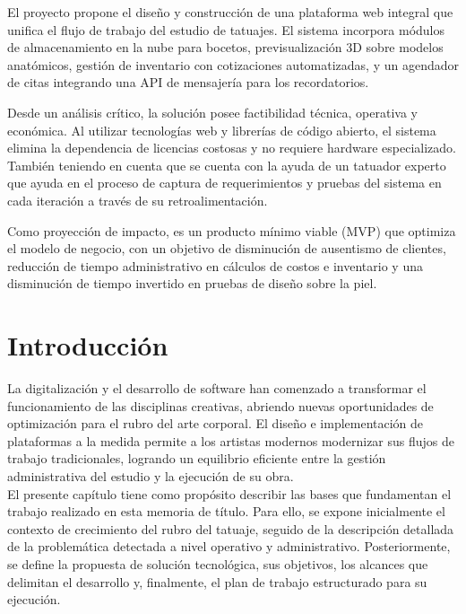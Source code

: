 \documentclass[12pt,letterpaper,oneside]{report}
\begin{document}
El proyecto propone el diseño y construcción de una plataforma web integral que unifica el flujo de trabajo del estudio de tatuajes. El sistema incorpora módulos de almacenamiento en la nube para bocetos, previsualización 3D sobre modelos anatómicos, gestión de inventario con cotizaciones automatizadas, y un agendador de citas integrando una API de mensajería para los recordatorios.

Desde un análisis crítico, la solución posee factibilidad técnica, operativa y económica. Al utilizar tecnologías web y librerías de código abierto, el sistema elimina la dependencia de licencias costosas y no requiere hardware especializado. También teniendo en cuenta que se cuenta con la ayuda de un tatuador experto que ayuda en el proceso de captura de requerimientos y pruebas del sistema en cada iteración a través de su retroalimentación.

Como proyección de impacto, es un producto mínimo viable (MVP) que optimiza el modelo de negocio, con un objetivo de disminución de ausentismo de clientes, reducción de tiempo administrativo en cálculos de costos e inventario y una disminución de tiempo invertido en pruebas de diseño sobre la piel.
\newpage

\renewcommand{\thepage}{\arabic{page}}

\chapter{Introducción}

La digitalización y el desarrollo de software han comenzado a transformar el funcionamiento de las disciplinas creativas, abriendo nuevas oportunidades de optimización para el rubro del arte corporal. El diseño e implementación de plataformas a la medida permite a los artistas modernos modernizar sus flujos de trabajo tradicionales, logrando un equilibrio eficiente entre la gestión administrativa del estudio y la ejecución de su obra.\\
\indent El presente capítulo tiene como propósito describir las bases que fundamentan el trabajo realizado en esta memoria de título. Para ello, se expone inicialmente el contexto de crecimiento del rubro del tatuaje, seguido de la descripción detallada de la problemática detectada a nivel operativo y administrativo. Posteriormente, se define la propuesta de solución tecnológica, sus objetivos, los alcances que delimitan el desarrollo y, finalmente, el plan de trabajo estructurado para su ejecución.
\end{document}
